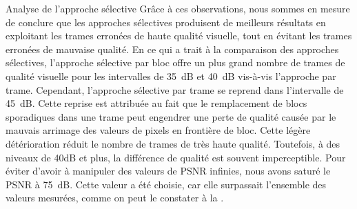 \begin{section}{Analyse de l'approche sélective}
Grâce à ces observations, nous sommes en mesure de conclure que les approches
sélectives produisent de meilleurs résultats en exploitant les trames erronées
de haute qualité visuelle, tout en évitant les trames erronées de mauvaise
qualité. En ce qui a trait à la comparaison des approches sélectives, l'approche
sélective par bloc offre un plus grand nombre de trames de qualité visuelle pour
les intervalles de 35~dB et 40~dB vis-à-vis l'approche par trame. Cependant,
l'approche sélective par trame se reprend dans l'intervalle de 45~dB. Cette
reprise est attribuée au fait que le remplacement de blocs sporadiques dans une trame
peut engendrer une perte de qualité causée par le mauvais arrimage des valeurs
de pixels en frontière de bloc. Cette légère détérioration réduit le nombre de
trames de très haute qualité. Toutefois, à des niveaux de 40dB et plus, la
différence de qualité est souvent imperceptible. Pour éviter d'avoir à manipuler
des valeurs de PSNR infinies, nous avons saturé le PSNR à 75~dB. Cette valeur a
été choisie, car elle surpassait l'ensemble des valeurs mesurées, comme on peut
le constater à la .


\end{section}
